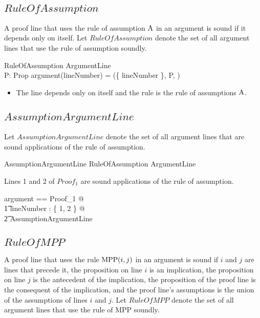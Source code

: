 \documentclass[11pt, oneside]{article}
\begin{document}
\subsection{$RuleOfAssumption$}

A proof line that uses the rule of assumption $\operatorname{A}$ in an argument is sound if it depends only on itself.
Let $RuleOfAssumption$ denote the set of all argument lines that use the rule of assumption soundly.

\begin{schema}{RuleOfAssumption}
	ArgumentLine \\
	P: Prop
\where
	argument(lineNumber) = (\{ lineNumber \}, P,  )
\end{schema}

\begin{itemize}
\item The line depends only on itself and the rule is the rule of assumptions $\operatorname{A}$.
\end{itemize}

\subsection{$AssumptionArgumentLine$}

Let $AssumptionArgumentLine$ denote the set of all argument lines that are sound applications
of the rule of assumption.

\begin{zed}
	AssumptionArgumentLine  RuleOfAssumption \project ArgumentLine
\end{zed}

\begin{example}
Lines 1 and 2 of $Proof_1$ are sound applications of the rule of assumption.

\begin{zed}
	\LET	argument == Proof_1 @ \\
	\t1	\forall lineNumber : \{ 1, 2 \} @ \\
	\t2		AssumptionArgumentLine
\end{zed}

\end{example}

\subsection{$RuleOfMPP$}

A proof line that uses the rule $\operatorname{MPP}(i,j)$ in an argument is sound if $i$ and $j$ are lines
that precede it, the proposition on line $i$ is an implication, the proposition on line $j$ is the antecedent
of the implication, the proposition of the proof line is the consequent of the implication,
and the proof line's assumptions is the union of the assumptions of lines $i$ and $j$.
Let $RuleOfMPP$ denote the set of all argument lines that use the rule of MPP soundly.
\end{document}
